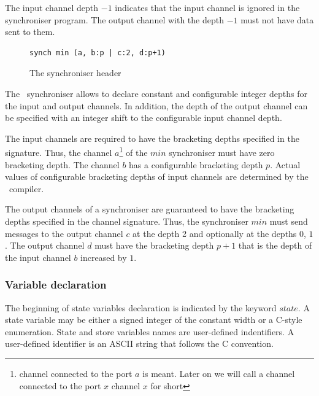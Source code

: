 The input channel depth $-1$ indicates that the input channel is ignored in the synchroniser program. The output channel with the depth $-1$ must not have data sent to them.

\begin{figure}[h!]
\begin{lstlisting}[frame=single]
synch min (a, b:p | c:2, d:p+1)
\end{lstlisting}
\caption{The synchroniser header}
\label{min_sync_head}
\end{figure}


The \ak\ synchroniser allows to declare constant and configurable integer depths for the input and output channels. In addition, the depth of the output channel can be specified with an integer shift to the configurable input channel depth.

The input channels are required to have the bracketing depths specified in the signature. Thus, the channel $a$\footnote{channel connected to the port $a$ is meant. Later on we will call a channel connected to the port $x$ channel $x$ for short} of the $min$ synchroniser must have zero bracketing depth. The channel $b$ has a configurable bracketing depth $p$. Actual values of configurable bracketing depths of input channels are determined by the \ak\ compiler. %

The output channels of a synchroniser are guaranteed to have the bracketing depths specified in the channel signature. Thus, the synchroniser $min$ must send messages to the output channel $c$ at the depth 2 and optionally at the depths $0$, $1$. The output channel $d$ must have the bracketing depth $p+1$ that is the depth of the input channel $b$ increased by $1$.


  \subsubsection{Variable declaration}
The beginning of state variables declaration is indicated by the keyword $state$. A state variable may be either a signed integer of the constant width or a C-style enumeration. State and store variables names are user-defined indentifiers. A user-defined identifier is an ASCII string that follows the C convention.

